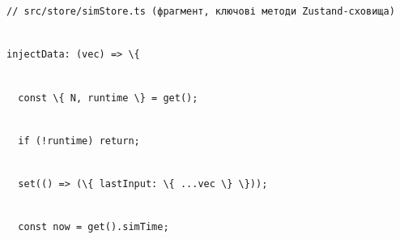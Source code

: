 \documentclass[
]{article}
\newcommand{\passthrough}[1]{#1}
\begin{document}
\passthrough{\lstinline!//!}\passthrough{\lstinline! !}\passthrough{\lstinline!src!}\passthrough{\lstinline!/!}\passthrough{\lstinline!store!}\passthrough{\lstinline!/!}\passthrough{\lstinline!simStore!}\passthrough{\lstinline!.!}\passthrough{\lstinline!ts!}\passthrough{\lstinline! !}\passthrough{\lstinline!(фрагмент,!}\passthrough{\lstinline! !}\passthrough{\lstinline!ключові!}\passthrough{\lstinline! !}\passthrough{\lstinline!методи!}\passthrough{\lstinline! !}\passthrough{\lstinline!Zustand!}\passthrough{\lstinline!-сховища)!}\strut \\
\passthrough{\lstinline!injectData!}\passthrough{\lstinline!:!}\passthrough{\lstinline! !}\passthrough{\lstinline!(!}\passthrough{\lstinline!vec!}\passthrough{\lstinline!)!}\passthrough{\lstinline! !}\passthrough{\lstinline!=>!}\passthrough{\lstinline! !}\passthrough{\lstinline!\{!}\strut \\
\passthrough{\lstinline!  !}\passthrough{\lstinline!const!}\passthrough{\lstinline! !}\passthrough{\lstinline!\{!}\passthrough{\lstinline! !}\passthrough{\lstinline!N!}\passthrough{\lstinline!,!}\passthrough{\lstinline! !}\passthrough{\lstinline!runtime!}\passthrough{\lstinline! !}\passthrough{\lstinline!\}!}\passthrough{\lstinline! !}\passthrough{\lstinline!=!}\passthrough{\lstinline! !}\passthrough{\lstinline!get!}\passthrough{\lstinline!();!}\strut \\
\passthrough{\lstinline!  !}\passthrough{\lstinline!if!}\passthrough{\lstinline! !}\passthrough{\lstinline"(!"}\passthrough{\lstinline!runtime!}\passthrough{\lstinline!)!}\passthrough{\lstinline! !}\passthrough{\lstinline!return!}\passthrough{\lstinline!;!}\strut \\
\passthrough{\lstinline!  !}\passthrough{\lstinline!set!}\passthrough{\lstinline!(()!}\passthrough{\lstinline! !}\passthrough{\lstinline!=>!}\passthrough{\lstinline! !}\passthrough{\lstinline!(\{!}\passthrough{\lstinline! !}\passthrough{\lstinline!lastInput!}\passthrough{\lstinline!:!}\passthrough{\lstinline! !}\passthrough{\lstinline!\{!}\passthrough{\lstinline! !}\passthrough{\lstinline!...!}\passthrough{\lstinline!vec!}\passthrough{\lstinline! !}\passthrough{\lstinline!\}!}\passthrough{\lstinline! !}\passthrough{\lstinline!\}));!}\strut \\
\passthrough{\lstinline!  !}\passthrough{\lstinline!const!}\passthrough{\lstinline! !}\passthrough{\lstinline!now!}\passthrough{\lstinline! !}\passthrough{\lstinline!=!}\passthrough{\lstinline! !}\passthrough{\lstinline!get!}\passthrough{\lstinline!().!}\passthrough{\lstinline!simTime!}\passthrough{\lstinline!;!}\strut \\
\end{document}
